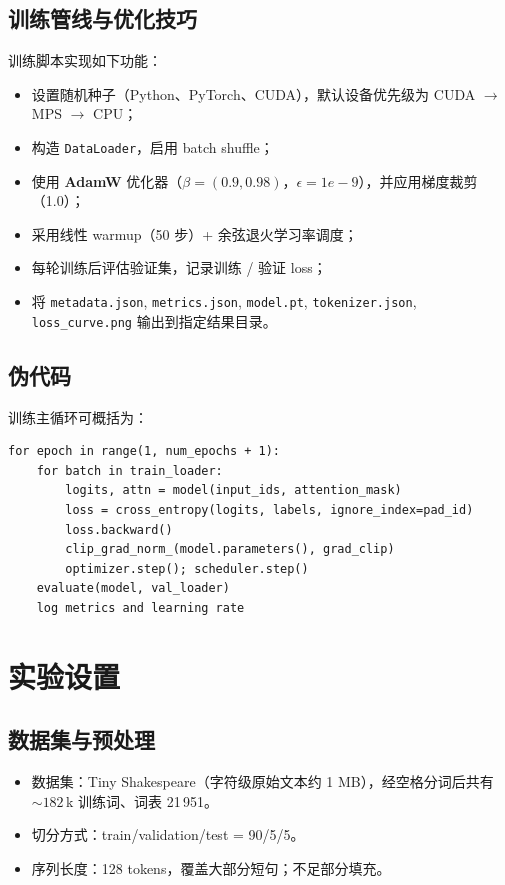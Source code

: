 \documentclass[12pt,a4paper]{article}
\begin{document}
\subsection{训练管线与优化技巧}
训练脚本实现如下功能：
\begin{itemize}
    \item 设置随机种子（Python、PyTorch、CUDA），默认设备优先级为 CUDA $\rightarrow$ MPS $\rightarrow$ CPU；
    \item 构造 \texttt{DataLoader}，启用 batch shuffle；
    \item 使用 \textbf{AdamW} 优化器（$\beta=(0.9,0.98)$，$\epsilon=1e-9$），并应用梯度裁剪（1.0）；
    \item 采用线性 warmup（50 步）+ 余弦退火学习率调度；
    \item 每轮训练后评估验证集，记录训练 / 验证 loss；
    \item 将 \texttt{metadata.json}, \texttt{metrics.json}, \texttt{model.pt}, \texttt{tokenizer.json}, \texttt{loss\_curve.png} 输出到指定结果目录。
\end{itemize}

\subsection{伪代码}
训练主循环可概括为：
\begin{verbatim}
for epoch in range(1, num_epochs + 1):
    for batch in train_loader:
        logits, attn = model(input_ids, attention_mask)
        loss = cross_entropy(logits, labels, ignore_index=pad_id)
        loss.backward()
        clip_grad_norm_(model.parameters(), grad_clip)
        optimizer.step(); scheduler.step()
    evaluate(model, val_loader)
    log metrics and learning rate
\end{verbatim}

\section{实验设置}
\subsection{数据集与预处理}
\begin{itemize}
    \item 数据集：Tiny Shakespeare（字符级原始文本约 1 MB），经空格分词后共有 $\sim182\,$k 训练词、词表 21\,951。
    \item 切分方式：train/validation/test = 90/5/5。
    \item 序列长度：128 tokens，覆盖大部分短句；不足部分填充。
\end{itemize}
\end{document}
